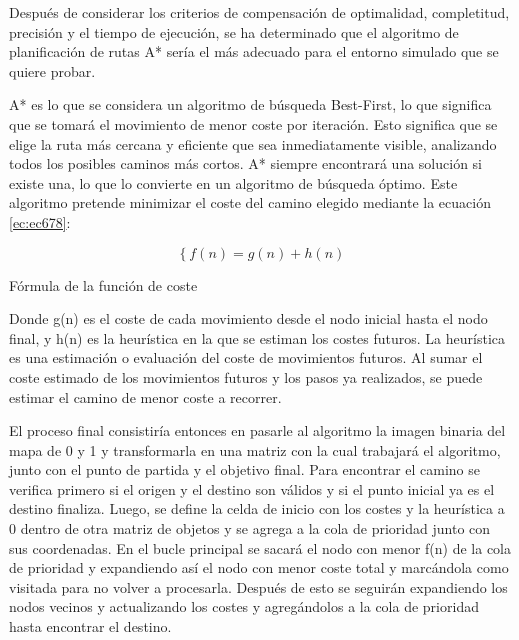 Después de considerar los criterios de compensación de optimalidad, completitud, precisión y el tiempo de ejecución, se ha determinado que el algoritmo de planificación de rutas A*
sería el más adecuado para el entorno simulado que se quiere probar. 


A* es lo que se considera un algoritmo de búsqueda Best-First, lo que significa que se tomará el movimiento de menor coste por iteración. Esto significa que se elige la ruta más cercana y eficiente que sea inmediatamente visible, analizando todos los posibles caminos más cortos. A* siempre encontrará una solución si existe una, lo que lo convierte en un algoritmo de búsqueda óptimo. Este algoritmo pretende minimizar el coste del camino elegido mediante la ecuación \ref{ec:ec678}:


\begin{myequation}[H]
\begin{equation}
\left\{
	f(n) = g(n) + h(n)
\right.
\label{ec:ec678}
\end{equation}
\caption[Fórmula de la función de coste]{Fórmula de la función de coste}
\end{myequation}


Donde g(n) es el coste de cada movimiento desde el nodo inicial hasta el nodo final, y h(n) es la
heurística en la que se estiman los costes futuros. La heurística es una estimación o evaluación del coste de
movimientos futuros. Al sumar el coste estimado de los movimientos futuros y los pasos ya realizados, se puede estimar el camino de menor coste a recorrer.


El proceso final consistiría entonces en pasarle al algoritmo la imagen binaria del mapa de 0 y 1 y transformarla en una matriz con la cual trabajará el algoritmo, junto con el punto de partida y el objetivo final. Para encontrar el camino se verifica primero si el origen y el destino son válidos y si el punto inicial ya es el destino finaliza. Luego, se define la celda de inicio con los costes y la heurística a 0 dentro de otra matriz de objetos y se agrega a la cola de prioridad junto con sus coordenadas. En el bucle principal se sacará el nodo con menor f(n) de la cola de prioridad y expandiendo así el nodo con menor coste total y marcándola como visitada para no volver a procesarla. Después de esto se seguirán expandiendo los nodos vecinos y actualizando los costes y agregándolos a la cola de prioridad hasta encontrar el destino.

